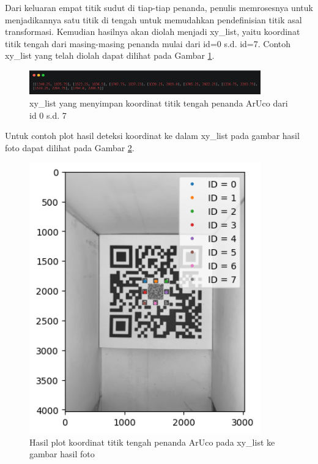 Dari keluaran empat titik sudut di tiap-tiap penanda, penulis memrosesnya untuk menjadikannya satu titik di tengah untuk memudahkan pendefinisian titik asal
transformasi. Kemudian hasilnya akan diolah menjadi xy\_list, yaitu koordinat titik tengah dari masing-masing penanda mulai dari id=0 s.d. id=7. Contoh
xy\_list yang telah diolah dapat dilihat pada Gambar \ref{Fig: 3-xylist}.

\begin{figure}[h]
	\centering
	\includegraphics[width=10cm]{contents/chapter-3/3-xylist.png}
	\caption{xy\_list yang menyimpan koordinat titik tengah penanda ArUco dari id 0 s.d. 7}
	\label{Fig: 3-xylist}
\end{figure}

\noindent Untuk contoh plot hasil deteksi koordinat ke dalam xy\_list pada gambar hasil foto dapat dilihat pada Gambar \ref{Fig: 3-plotxylist}.

\begin{figure}[h]
	\centering
	\includegraphics[width=10cm]{contents/chapter-3/3-plotxylist.png}
	\caption{Hasil plot koordinat titik tengah penanda ArUco pada xy\_list ke gambar hasil foto}
	\label{Fig: 3-plotxylist}
\end{figure}

